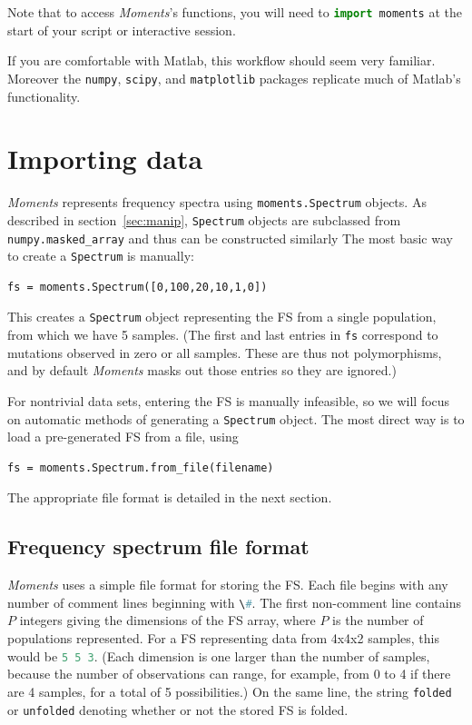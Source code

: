 \documentclass[12pt]{article}
\makeatletter
\newcommand{\py}[1]{\lstinline[breaklines=true,language=Python, showstringspaces=False]@#1@}
\makeatother
\begin{document}
Note that to access \textit{Moments}'s functions, you will need to \py{import moments} at the start of your script or interactive session.

If you are comfortable with Matlab, this workflow should seem very familiar.
Moreover the \py{numpy}, \py{scipy}, and \py{matplotlib} packages replicate much of Matlab's functionality.

\section{Importing data}

\textit{Moments} represents frequency spectra using \py{moments.Spectrum} objects.
As described in section~\ref{sec:manip}, \py{Spectrum} objects are subclassed from \py{numpy.masked_array} and thus can be constructed similarly
The most basic way to create a \py{Spectrum} is manually:
\begin{lstlisting}
fs = moments.Spectrum([0,100,20,10,1,0])
\end{lstlisting}
This creates a \py{Spectrum} object representing the FS from a single population, from which we have 5 samples.
(The first and last entries in \py{fs} correspond to mutations observed in zero or all samples. These are thus not polymorphisms, and by default \textit{Moments} masks out those entries so they are ignored.)

For nontrivial data sets, entering the FS is manually infeasible, so we will focus on automatic methods of generating a \py{Spectrum} object.
The most direct way is to load a pre-generated FS from a file, using
\begin{lstlisting}
fs = moments.Spectrum.from_file(filename)
\end{lstlisting}
The appropriate file format is detailed in the next section.

\subsection{Frequency spectrum file format}

\textit{Moments} uses a simple file format for storing the FS.
Each file begins with any number of comment lines beginning with \py{\#}.
The first non-comment line contains $P$ integers giving the dimensions of the FS array, where $P$ is the number of populations represented.
For a FS representing data from 4x4x2 samples, this would be \py{5 5 3}.
(Each dimension is one larger than the number of samples, because the number of observations can range, for example, from 0 to 4 if there are 4 samples, for a total of 5 possibilities.)
On the same line, the string \py{folded} or \py{unfolded} denoting whether or not the stored FS is folded.
\end{document}
